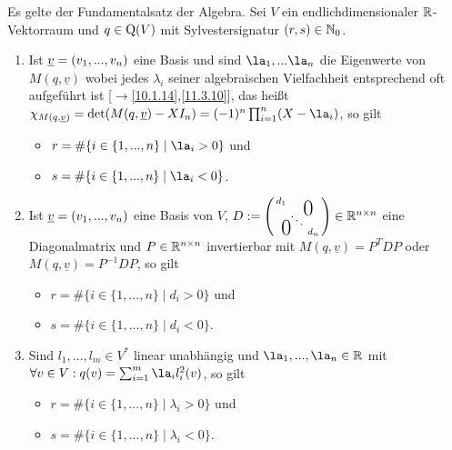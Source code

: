 \documentclass[../../main.tex]{subfiles}
\begin{document}
\begin{sat}\label{14.1.2}
Es gelte der Fundamentalsatz der Algebra. Sei $V$ ein endlichdimensionaler $\mathbb R$-Vektorraum und $q\in \operatorname{Q}(V)$ mit Sylvestersignatur $(r,s)\in \mathbb N_0$.
\begin{enumerate}[\normalfont(a)]
\item Ist ${\underline v}=(v_1,...,v_n)$ eine Basis und sind $\la_1,...\la_n$ die Eigenwerte von $M(q,\underline{v})$ wobei jedes $\lambda_i$ seiner algebraischen Vielfachheit entsprechend oft aufgeführt ist [$\to$\ref{10.1.14},\ref{11.3.10}], das heißt $\chi_{M(q,\underline{v})}=\det(M(q,\v)-XI_n)=(-1)^n\prod_{i=1}^n(X - \la_i)$, so gilt
\begin{itemize}
\item $r=\#\{i\in \{1,...,n\}\mid \la_i>0\}$ und
\item $s=\#\{i\in \{1,...,n\}\mid \la_i<0\}$.
\end{itemize}
\item Ist ${\underline v}=(v_1,...,v_n)$ eine Basis von $V$, $D:=\left(\begin{smallmatrix}
d_1 & & \llap{$\overset{\blap{\LARGE 0}}{~}$} \\
& \ddots &\\
\rlap{\tlap{\LARGE 0}} & & d_n\end{smallmatrix}\right)\in \R^{n\times n}$ eine Diagonalmatrix und $P\in \mathbb R^{n\times n}$ invertierbar mit $M(q,\underline{v})=P^TDP$ oder $M(q,\underline{v})=P^{-1}DP$, so gilt
\begin{itemize}
\item $r=\#\{i\in \{1,...,n\}\mid d_i>0\}$ und
\item $s=\#\{i\in \{1,...,n\}\mid d_i<0\}$.
\end{itemize}
\item Sind $l_1,...,l_m\in V^*$ linear unabhängig und $\la_1,...,\la_n\in \R$ mit $\forall v\in V: q(v)=\sum_{i=1}^m\la_il_i^2(v)$, so gilt
\begin{itemize}
\item $r=\#\{i\in \{1,...,n\}\mid \lambda_i>0\}$ und
\item $s=\#\{i\in \{1,...,n\}\mid \lambda_i<0\}$.
\end{itemize}
\end{enumerate}
\end{sat}
\end{document}

